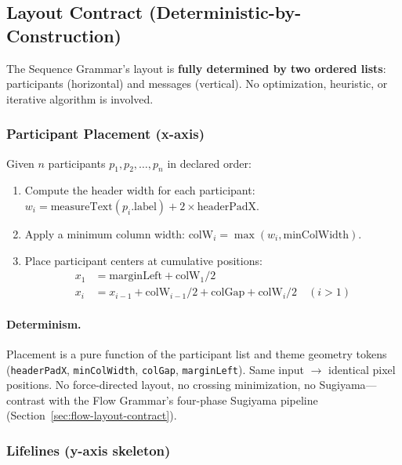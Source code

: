 \subsection{Layout Contract (Deterministic-by-Construction)}
\label{sec:sequence-layout-contract}

The Sequence Grammar's layout is \textbf{fully determined by two ordered lists}: participants (horizontal) and messages (vertical). No optimization, heuristic, or iterative algorithm is involved.

\subsubsection{Participant Placement (x-axis)}

Given $n$ participants $p_1, p_2, \ldots, p_n$ in declared order:

\begin{enumerate}
  \item Compute the header width for each participant: $w_i = \text{measureText}(p_i.\text{label}) + 2 \times \text{headerPadX}$.
  \item Apply a minimum column width: $\text{colW}_i = \max(w_i, \text{minColWidth})$.
  \item Place participant centers at cumulative positions:
    \begin{align*}
      x_1 &= \text{marginLeft} + \text{colW}_1 / 2 \\
      x_i &= x_{i-1} + \text{colW}_{i-1}/2 + \text{colGap} + \text{colW}_i/2 \quad (i > 1)
    \end{align*}
\end{enumerate}

\paragraph{Determinism.}
Placement is a pure function of the participant list and theme geometry tokens (\texttt{headerPadX}, \texttt{minColWidth}, \texttt{colGap}, \texttt{marginLeft}). Same input $\rightarrow$ identical pixel positions. No force-directed layout, no crossing minimization, no Sugiyama---contrast with the Flow Grammar's four-phase Sugiyama pipeline (Section~\ref{sec:flow-layout-contract}).

\subsubsection{Lifelines (y-axis skeleton)}

